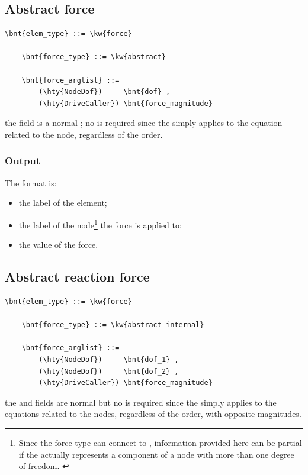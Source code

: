 \subsection{Abstract force}\label{sec:EL:FORCE:ABSTRACT}
\begin{Verbatim}[commandchars=\\\{\}]
    \bnt{elem_type} ::= \kw{force}

    \bnt{force_type} ::= \kw{abstract}

    \bnt{force_arglist} ::=
        (\hty{NodeDof})     \bnt{dof} ,
        (\hty{DriveCaller}) \bnt{force_magnitude}
\end{Verbatim}
the  field is a normal ; no  is required
since the  simply applies to the equation related to the node,
regardless of the order.

\subsubsection{Output}
The format is:
\begin{itemize}
    \item the label of the element;
    \item the label of the node\footnote{Since the  force type
	can connect to , information provided here
	can be partial if the  actually represents
	a component of a node with more than one degree of freedom.
	\label{footnote:EL:FORCE:ABSTRACT:OUTPUT:node_dof}}
	the force is applied to;
    \item the value of the force.
\end{itemize}

\subsection{Abstract reaction force}
\begin{Verbatim}[commandchars=\\\{\}]
    \bnt{elem_type} ::= \kw{force}

    \bnt{force_type} ::= \kw{abstract internal}

    \bnt{force_arglist} ::=
        (\hty{NodeDof})     \bnt{dof_1} ,
        (\hty{NodeDof})     \bnt{dof_2} ,
        (\hty{DriveCaller}) \bnt{force_magnitude}
\end{Verbatim}
the  and  fields are normal 
but no  is required since the  simply applies
to the equations related to the nodes, regardless of the order, with
opposite magnitudes.

